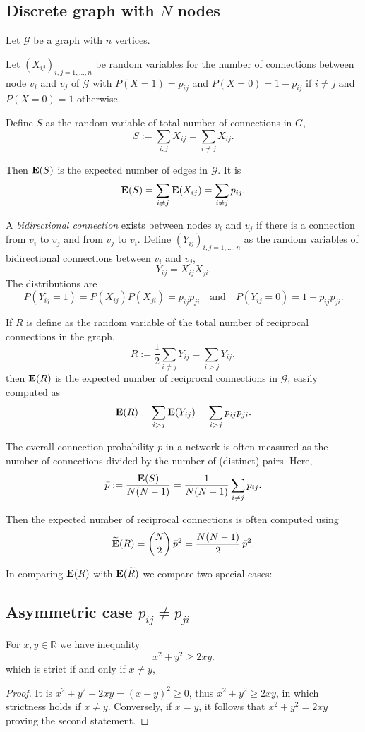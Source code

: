 \subsection{Discrete graph with $N$ nodes}

Let $\mathcal{G}$ be a graph with $n$ vertices.

Let $(X_{ij})_{i,j=1,...,n}$ be random variables for the number of connections between node $v_i$ and $v_j$ of $\mathcal{G}$ with $P(X=1)=p_{ij}$ and $P(X=0)=1-p_{ij}$ if $i \neq j$ and $P(X=0) =1 $ otherwise.

Define $S$ as the random variable of total number of connections in $G$,
\[
S := \sum_{i,j} X_{ij} = \sum_{i \neq j} X_{ij}.
\]

Then $\operatorname{\mathbf{E}}(S)$ is the expected number of edges in $\mathcal{G}$. It is
\[
\operatorname{\mathbf{E}}(S) = \sum_{i \neq j} \operatorname{\mathbf{E}}(X_{ij}) = \sum_{i \neq j} p_{ij}.
\]

A \emph{bidirectional connection} exists between nodes $v_i$ and $v_j$ if there is a connection from $v_i$ to $v_j$ and from $v_j$ to $v_i$. Define  $(Y_{ij})_{i,j=1,...,n}$ as the random variables of bidirectional connections between $v_i$ and $v_j$,
\[
Y_{ij} = X_{ij} X_{ji}.
\]
The distributions are
\[
P(Y_{ij} = 1) = P(X_{ij}) P(X_{ji}) = p_{ij} p_{ji} \quad \mathrm{and} \quad P(Y_{ij} = 0) = 1 - p_{ij}p_{ji}.
\]

If $R$ is define as the random variable of the total number of reciprocal connections in the graph,
\[
R := \frac{1}{2} \sum_{i \neq j} Y_{ij} = \sum_{i > j} Y_{ij},
\]
then $\operatorname{\mathbf{E}}(R)$ is the expected number of reciprocal connections in $\mathcal{G}$, easily computed as
\[
\operatorname{\mathbf{E}}(R) = \sum_{i>j} \operatorname{\mathbf{E}}(Y_{ij}) = \sum_{i > j} p_{ij} p_{ji}.
\]

The overall connection probability $\bar{p}$ in a network is often measured as the number of connections divided by the number of (distinct) pairs. Here,
\[
\bar{p} := \frac{\operatorname{\mathbf{E}}(S)}{N(N-1)} = \frac{1}{N(N-1)} \sum_{i \neq j} p_{ij}.
\]

Then the expected number of reciprocal connections is often computed using
\[
\widetilde{\operatorname{\mathbf{E}}}(R) = \binom{N}{2}\, \bar{p}^2 = \frac{N(N-1)}{2}\,  \bar{p}^2.
\]

In comparing $\operatorname{\mathbf{E}}(R)$ with $\operatorname{\mathbf{E}}(\widetilde{R})$ we compare two special cases:


\subsection{Asymmetric case $p_{ij} \neq  p _{ji}$}

\begin{lemma}
  For $x,y \in \mathbb{R}$ we have inequality
  \[
  x^2 + y^2 \geq 2xy.
  \]
  which is strict if and only if $x \neq y$,
  \end{lemma}

\begin{proof}
  It is $x^2 + y^2 - 2xy = (x - y)^2 \geq 0 $, thus $  x^2 + y^2 \geq 2xy$, in which strictness holds if $x \neq y$. Conversely, if $x=y$, it follows that $x^2 + y^2 = 2xy$ proving the second statement.
\end{proof}

